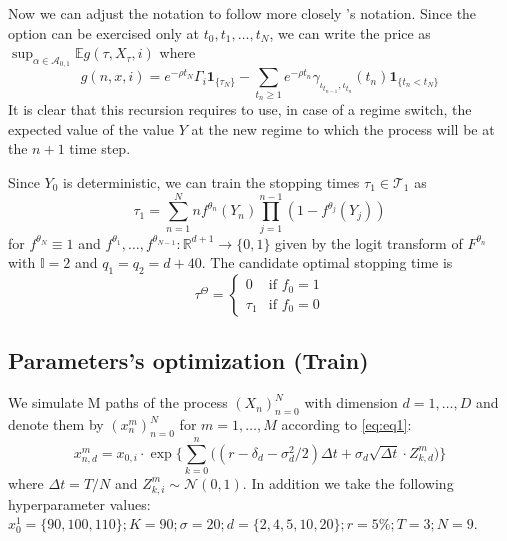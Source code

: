 \documentclass{article}
\begin{document}
Now we can adjust the notation to follow more closely \cite{becker2019deep}'s notation. Since the option can be exercised only at $t_0, t_1, \ldots, t_N$, we can write the price as $\sup_{\alpha \in \mathcal{A}_{0,1}} \mathbb{E} g(\tau, X_{\tau}, i)$ where
\begin{equation}
    g(n, x, i) = e^{-\rho t_N}\Gamma_{i}\mathbf{1}_{\{\tau_N \}} - \sum_{t_n \geq 1} e^{- \rho t_n} \gamma_{\iota_{t_{n-1}}, \iota_{t_n}}(t_n) \mathbf{1}_{\{t_n < t_N \}}
\end{equation}
It is clear that this recursion requires to use, in case of a regime switch, the expected value of the value $Y$ at the new regime to which the process will be at the $n+1$ time step. 

Since $Y_0$ is deterministic, we can train the stopping times $\tau_1 \in \mathcal{T}_1$ as
\begin{equation}
    \tau_{1} = \sum_{n=1}^N n f^{\theta_n}(Y_n) \prod _{j=1}^{n-1} (1-f^{\theta_j}(Y_j))
\end{equation}
for $f^{\theta_N} \equiv 1$ and $f^{\theta_1}, \ldots, f^{\theta_{N-1}} : \mathbb{R}^{d+1} \rightarrow \{0,1\}$ given by the logit transform of $F^{\theta_n}$ with $\mathbb{I}=2$ and $q_1=q_2 = d+40$. The candidate optimal stopping time is 
\begin{equation}
\tau^{\Theta} = \begin{cases}
0 & \text{if } f_0=1\\
\tau_1 & \text{if } f_0=0
      
    \end{cases}
\end{equation}



\subsection{Parameters's optimization (Train)}
We simulate M paths of the process $(X_n)_{n=0}^N$ with dimension $d=1, \ldots, D$ and denote them by $(x_n^m)_{n=0}^N$ for $m=1, \ldots, M$ according to \ref{eq:eq1}:
\begin{equation}
    x_{n,d}^m = x_{0,i} \cdot \exp \Bigg\{ \sum_{k=0}^n \Big( (r-\delta_d - \sigma_d^2 /2) \Delta t + \sigma_d \sqrt{\Delta t} \cdot Z_{k,d}^m   \Big) \Bigg\}
\end{equation}
where $\Delta t = T/N$ and $Z_{k,i}^m \sim \mathcal{N}(0,1)$. In addition we take the following hyperparameter values: $x_0^1=\{90, 100, 110\}; K=90;\sigma = 20; d=\{2, 4, 5, 10, 20\}; r= 5\%; T=3;N=9$.
\end{document}
